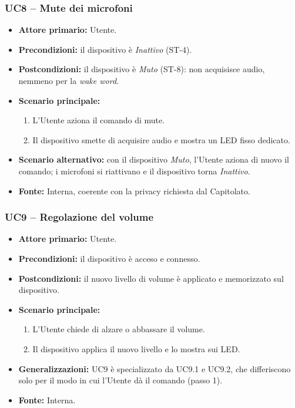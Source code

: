 \documentclass[12pt,a4paper]{article}
\newcommand{\tightlist}{\setlength{\itemsep}{1pt}\setlength{\parskip}{0pt}}
\begin{document}
\subsubsection{UC8 -- Mute dei microfoni}
\begin{itemize}
\tightlist
\item \textbf{Attore primario:} Utente.
\item \textbf{Precondizioni:} il dispositivo è \emph{Inattivo} (ST-4).
\item \textbf{Postcondizioni:} il dispositivo è \emph{Muto} (ST-8): non acquisisce audio, nemmeno per la \emph{wake word}.
\item \textbf{Scenario principale:}
\begin{enumerate}
\tightlist
\item L'Utente aziona il comando di mute.
\item Il dispositivo smette di acquisire audio e mostra un LED fisso dedicato.
\end{enumerate}
\item \textbf{Scenario alternativo:} con il dispositivo \emph{Muto}, l'Utente aziona di nuovo il comando; i microfoni si riattivano e il dispositivo torna \emph{Inattivo}.
\item \textbf{Fonte:} Interna, coerente con la privacy richiesta dal Capitolato.
\end{itemize}

\subsubsection{UC9 -- Regolazione del volume}
\begin{itemize}
\tightlist
\item \textbf{Attore primario:} Utente.
\item \textbf{Precondizioni:} il dispositivo è acceso e connesso.
\item \textbf{Postcondizioni:} il nuovo livello di volume è applicato e memorizzato sul dispositivo.
\item \textbf{Scenario principale:}
\begin{enumerate}
\tightlist
\item L'Utente chiede di alzare o abbassare il volume.
\item Il dispositivo applica il nuovo livello e lo mostra sui LED.
\end{enumerate}
\item \textbf{Generalizzazioni:} UC9 è specializzato da UC9.1 e UC9.2, che differiscono solo per il modo in cui l'Utente dà il comando (passo 1).
\item \textbf{Fonte:} Interna.
\end{itemize}
\end{document}
